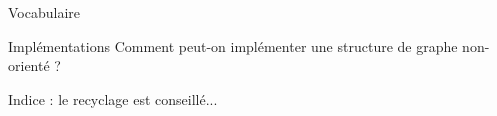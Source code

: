 \documentclass[10pt]{beamer}
\begin{document}
\begin{frame}{Vocabulaire}
\begin{center}
\end{center}
\end{frame}
\begin{frame}{Implémentations}
Comment peut-on implémenter une structure de graphe non-orienté ?\pause

Indice : le recyclage est conseillé...
\end{frame}
\end{document}
